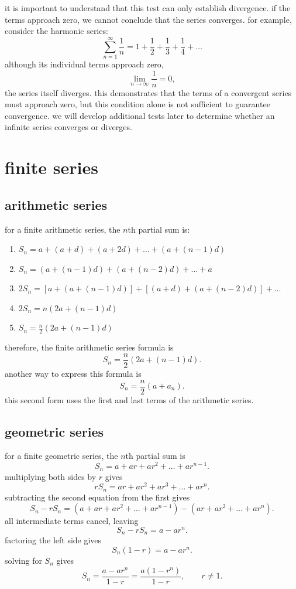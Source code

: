 \documentclass{article}
\begin{document}
it is important to understand that this test can only establish divergence. if the terms approach zero, we cannot conclude that the series converges. for example, consider the harmonic series:
\[
\sum_{n=1}^{\infty}\frac{1}{n}
=
1+\frac12+\frac13+\frac14+\ldots
\]
although its individual terms approach zero,
\[
\lim_{n\to\infty}\frac{1}{n}=0,
\]
the series itself diverges. this demonstrates that the terms of a convergent series must approach zero, but this condition alone is not sufficient to guarantee convergence. we will develop additional tests later to determine whether an infinite series converges or diverges.\\

\newpage

\section{finite series}

\subsection{arithmetic series}

for a finite arithmetic series, the $n$th partial sum is:
\begin{enumerate}
    \item $S_n = a + (a + d) + (a + 2d) + \ldots + (a + (n - 1)d)$
    \item $S_n = (a + (n - 1)d) + (a + (n - 2)d) + \ldots + a$
    \item $2S_n = [a + (a + (n - 1)d)] + [(a + d) + (a + (n - 2)d)] + \ldots$
    \item $2S_n = n(2a + (n - 1)d)$
    \item $S_n = \frac{n}{2}(2a + (n - 1)d)$
\end{enumerate}

therefore, the finite arithmetic series formula is
\[
\boxed{S_n=\frac{n}{2}(2a+(n-1)d).}
\]
another way to express this formula is
\[
\boxed{S_n=\frac{n}{2}(a+a_n).}
\]
this second form uses the first and last terms of the arithmetic series.\\

\subsection{geometric series}

for a finite geometric series, the $n$th partial sum is
\[
S_n=a+ar+ar^2+\ldots+ar^{n-1}.
\]
multiplying both sides by $r$ gives
\[
rS_n=ar+ar^2+ar^3+\ldots+ar^n.
\]
subtracting the second equation from the first gives
\[
S_n-rS_n
=
(a+ar+ar^2+\ldots+ar^{n-1})
-(ar+ar^2+\ldots+ar^n).
\]
all intermediate terms cancel, leaving
\[
S_n-rS_n=a-ar^n.
\]
factoring the left side gives
\[
S_n(1-r)=a-ar^n.
\]
solving for $S_n$ gives
\[
\boxed{
S_n=\frac{a-ar^n}{1-r}
=\frac{a(1-r^n)}{1-r},
\qquad r\neq1.
}
\]
\end{document}
